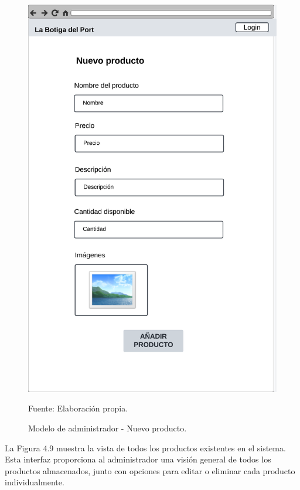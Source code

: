 \begin{figure}[H]
\begin{center}
\includegraphics[scale=0.5]{./Images/nuevo_producto.png}
\caption{Modelo de administrador - Nuevo producto.} Fuente: Elaboración propia.

\label{fig:fig8}

\end{center}
\end{figure}

La Figura 4.9 muestra la vista de todos los productos existentes en el sistema. Esta interfaz proporciona al administrador una visión general de todos los productos almacenados, junto con opciones para editar o eliminar cada producto individualmente. 


